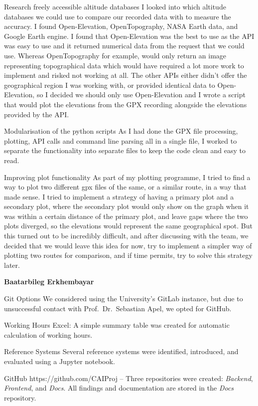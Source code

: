 \documentclass[12pt]{article}
\begin{document}
Research freely accessible altitude databases
I looked into which altitude databases we could use to compare our recorded data with to measure the accuracy. I found Open-Elevation, OpenTopography, NASA Earth data, and Google Earth engine. I found that Open-Elevation was the best to use as the API was easy to use and it returned numerical data from the request that we could use. Whereas OpenTopography for example, would only return an image representing topographical data which would have required a lot more work to implement and risked not working at all. The other APIs either didn't offer the geographical region I was working with, or provided identical data to Open-Elevation, so I decided we should only use Open-Elevation and I wrote a script that would plot the elevations from the GPX recording alongside the elevations provided by the API.

Modularisation of the python scripts
As I had done the GPX file processing, plotting, API calls and command line parsing all in a single file, I worked to separate the functionality into separate files to keep the code clean and easy to read.

Improving plot functionality
As part of my plotting programme, I tried to find a way to plot two different gpx files of the same, or a similar route, in a way that made sense. I tried to implement a strategy of having a primary plot and a secondary plot, where the secondary plot would only show on the graph when it was within a certain distance of the primary plot, and leave gaps where the two plots diverged, so the elevations would represent the same geographical spot. But this turned out to be incredibly difficult, and after discussing with the team, we decided that we would leave this idea for now, try to implement a simpler way of plotting two routes for comparison, and if time permits, try to solve this strategy later.

{\large\textbf{Baatarbileg Erkhembayar}}

Git Options
We considered using the University's GitLab instance, but due to unsuccessful contact with Prof.\ Dr.\ Sebastian Apel, we opted for GitHub.

Working Hours Excel:
A simple summary table was created for automatic calculation of working hours.

Reference Systems
Several reference systems were identified, introduced, and evaluated using a Jupyter notebook.

GitHub
https://github.com/CAIProj – Three repositories were created: \textit{Backend}, \textit{Frontend}, and \textit{Docs}. All findings and documentation are stored in the \textit{Docs} repository.
\end{document}
